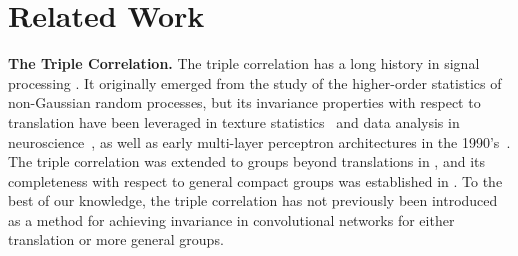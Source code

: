 \section{Related Work}


\textbf{The Triple Correlation.} The triple correlation has a long history in signal processing \cite{tukey1953spectral, brillinger1991some, nikias1993signal}. It originally emerged from the study of the higher-order statistics of non-Gaussian random processes, but its invariance properties with respect to translation have been leveraged in texture statistics~\cite{yellott1993implications} and
data analysis in neuroscience~\cite{deshpande2023third}, as well as early multi-layer perceptron architectures in the 1990's~\cite{delopoulos1994invariant,kollias1996multiresolution}. The triple correlation was extended to groups beyond translations in \cite{kakarala1992triple}, and its completeness with respect to general compact groups was established in \cite{kakarala2009completeness}. To the best of our knowledge, the triple correlation has not previously been introduced as a method for achieving invariance in convolutional networks for either translation or more general groups.



